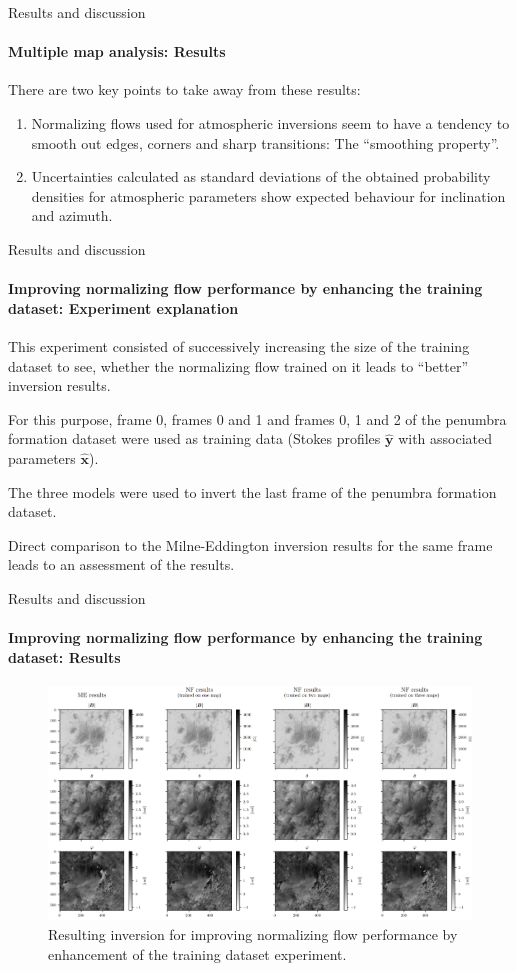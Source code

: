 \documentclass{beamer}
\newcommand\matr[1]{\ensuremath{\boldsymbol{\mathbf{#1}}}}
\begin{document}
\begin{frame}[allowframebreaks]{Results and discussion}
\framesubtitle{Multiple map analysis: Results} %
There are two key points to take away from these results:
\begin{enumerate}
\item Normalizing flows used for atmospheric inversions seem to have a tendency to smooth out edges, corners and sharp transitions: The ``smoothing property''.
\item Uncertainties calculated as standard deviations of the obtained probability densities for atmospheric parameters show expected behaviour for inclination and azimuth.
\end{enumerate}
\end{frame}

\begin{frame}[allowframebreaks]{Results and discussion}
\framesubtitle{Improving normalizing flow performance by enhancing the training dataset: Experiment explanation} %
This experiment consisted of successively increasing the size of the training dataset to see, whether the normalizing flow trained on it leads to ``better'' inversion results.

For this purpose, frame 0, frames 0 and 1 and frames 0, 1 and 2 of the penumbra formation dataset were used as training data (Stokes profiles $\hat{\matr{y}}$ with associated parameters $\hat{\matr{x}}$).

The three models were used to invert the last frame of the penumbra formation dataset.

Direct comparison to the Milne-Eddington inversion results for the same frame leads to an assessment of the results.
\end{frame}

\begin{frame}[allowframebreaks]{Results and discussion}
	\framesubtitle{Improving normalizing flow performance by enhancing the training dataset: Results} %
	\vspace{-0.5cm}
\begin{figure}[h!]
	\centering
	\includegraphics[width=\textwidth]{figures/presentation/exp5_fig1.png}
	\caption{Resulting inversion for improving normalizing flow performance by enhancement of the training dataset experiment.}
	\label{fig:exp5_fig1}
\end{figure}
\end{frame}
\end{document}
